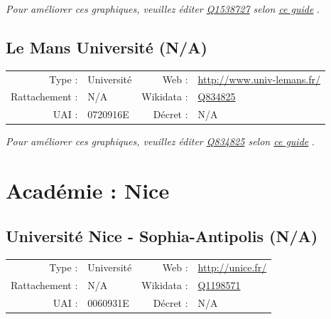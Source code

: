 \documentclass[12pt,french,landscape]{article}
\begin{document}
\textit{\scriptsize Pour améliorer ces graphiques, veuillez éditer \href{https://www.wikidata.org/entity/Q1538727}{Q1538727}  selon \href{https://github.com/cpesr/wikidataESR/blob/master/Rmd/wikidataESR.md}{ce guide}}
.


\newpage

\hypertarget{le-mans-universituxe9-na}{%
\subsection{Le Mans Université (N/A)}\label{le-mans-universituxe9-na}}

\begin{tabular*}{0.45\textwidth}{rp{2cm}rl}  
\hline  
Type : & Université & Web : &\href{http://www.univ-lemans.fr/}{http://www.univ-lemans.fr/} \\  
Rattachement : & N/A & Wikidata : & \href{https://www.wikidata.org/entity/Q834825}{Q834825} \\  
UAI : & 0720916E & Décret : & N/A \\  
\hline  
\end{tabular*}

\textit{\scriptsize Pour améliorer ces graphiques, veuillez éditer \href{https://www.wikidata.org/entity/Q834825}{Q834825}  selon \href{https://github.com/cpesr/wikidataESR/blob/master/Rmd/wikidataESR.md}{ce guide}}
.


\newpage

\hypertarget{acaduxe9mie-nice}{%
\section{Académie : Nice}\label{acaduxe9mie-nice}}

\hypertarget{universituxe9-nice---sophia-antipolis-na}{%
\subsection{Université Nice - Sophia-Antipolis
(N/A)}\label{universituxe9-nice---sophia-antipolis-na}}

\begin{tabular*}{0.45\textwidth}{rp{2cm}rl}  
\hline  
Type : & Université & Web : &\href{http://unice.fr/}{http://unice.fr/} \\  
Rattachement : & N/A & Wikidata : & \href{https://www.wikidata.org/entity/Q1198571}{Q1198571} \\  
UAI : & 0060931E & Décret : & N/A \\  
\hline  
\end{tabular*}
\end{document}
